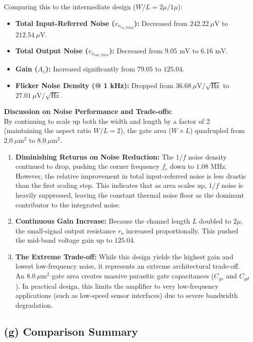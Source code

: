 \documentclass[12pt, a4paper]{article}
\begin{document}
Comparing this to the intermediate design ($W/L = 2\mu/1\mu$):
\begin{itemize}
    \item \textbf{Total Input-Referred Noise ($v_{n_{in,Total}}$):} Decreased from $242.22 \ \mu\text{V}$ to $212.54 \ \mu\text{V}$.
    \item \textbf{Total Output Noise ($v_{n_{out,Total}}$):} Decreased from $9.05 \text{ mV}$ to $6.16 \text{ mV}$.
    \item \textbf{Gain ($A_v$):} Increased significantly from $79.05$ to $125.04$.
    \item \textbf{Flicker Noise Density (@ 1 kHz):} Dropped from $36.68 \ \mu\text{V}/\sqrt{\text{Hz}}$ to $27.01 \ \mu\text{V}/\sqrt{\text{Hz}}$.
\end{itemize}

\vspace{0.3cm}
\textbf{Discussion on Noise Performance and Trade-offs:} \\
By continuing to scale up both the width and length by a factor of 2 (maintaining the aspect ratio $W/L = 2$), the gate area ($W \times L$) quadrupled from $2.0 \ \mu\text{m}^2$ to $8.0 \ \mu\text{m}^2$.
\begin{enumerate}
    \item \textbf{Diminishing Returns on Noise Reduction:} The $1/f$ noise density continued to drop, pushing the corner frequency $f_c$ down to $1.08 \text{ MHz}$. However, the relative improvement in total input-referred noise is less drastic than the first scaling step. This indicates that as area scales up, $1/f$ noise is heavily suppressed, leaving the constant thermal noise floor as the dominant contributor to the integrated noise.
    \item \textbf{Continuous Gain Increase:} Because the channel length $L$ doubled to $2\mu$, the small-signal output resistance $r_o$ increased proportionally. This pushed the mid-band voltage gain up to $125.04$.
    \item \textbf{The Extreme Trade-off:} While this design yields the highest gain and lowest low-frequency noise, it represents an extreme architectural trade-off. An $8.0 \ \mu\text{m}^2$ gate area creates massive parasitic gate capacitances ($C_{gs}$ and $C_{gd}$). In practical design, this limits the amplifier to very low-frequency applications (such as low-speed sensor interfaces) due to severe bandwidth degradation.
\end{enumerate}

\subsection*{(g) Comparison Summary}
\end{document}
